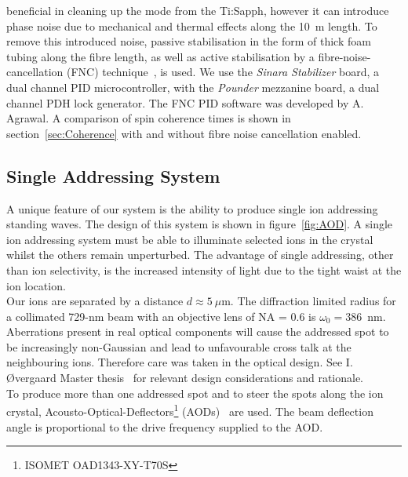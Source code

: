    beneficial in cleaning up the mode from the Ti:Sapph, however it can
    introduce phase noise due to mechanical and thermal effects along the 10~m
    length. To remove this introduced noise, passive stabilisation in
    the form of thick foam tubing along the fibre length, as well as active
    stabilisation by a fibre-noise-cancellation (FNC) technique~\cite{ma1994delivering}, is used. We use the \emph{Sinara Stabilizer} board, a
    dual channel PID microcontroller, with the \emph{Pounder}
    mezzanine board, a dual channel PDH lock generator. The FNC PID software was
    developed by A. Agrawal. A comparison of spin coherence times
    is shown in section~\ref{sec:Coherence} with and without fibre noise
    cancellation enabled. \\


\subsection{Single Addressing System}
\label{sec:Single Addressing System}
    A unique feature of our system is the ability to produce single ion addressing standing waves.
    The design of this system is shown in
    figure~\ref{fig:AOD}.  A single ion addressing system must be able to
    illuminate selected ions in the crystal whilst the others remain
    unperturbed. The advantage of single addressing, other than ion selectivity,
    is the increased intensity of light due to the tight waist at the ion
    location. \\
    Our ions are separated by a distance $d\approx 5~\mu$m.  The diffraction limited radius for a
    collimated 729-nm beam with an objective lens of NA = 0.6 is $\omega_0 = 386$~nm.  Aberrations present in real optical
    components will cause the addressed spot to be increasingly non-Gaussian and
    lead to unfavourable cross talk at the neighbouring ions. Therefore care was
    taken in the optical design. See I. {\O}vergaard Master thesis~\cite{oevergaard2024limiting} for relevant design considerations and rationale.\\
    To produce more than one addressed spot and to steer the spots along the ion
    crystal, Acousto-Optical-Deflectors\footnote{ISOMET OAD1343-XY-T70S}
    (AODs)~\cite{nagourney2014quantum, li2023low-crosstalk} are used. The beam deflection angle is proportional to the
    drive frequency supplied to the AOD. \\
